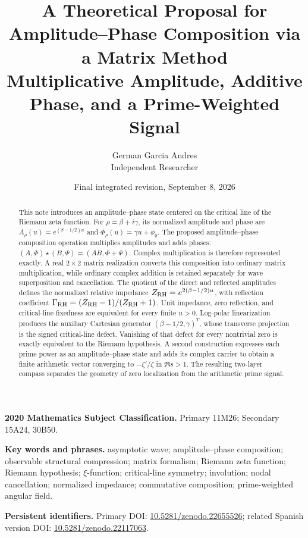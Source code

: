 \documentclass[11pt]{article}
\title{\textbf{A Theoretical Proposal for Amplitude--Phase Composition via a Matrix Method}\\[2mm]
\large Multiplicative Amplitude, Additive Phase, and a Prime-Weighted Signal}
\author{German Garcia Andres\\[1mm]\small Independent Researcher}
\date{Final integrated revision, September 8, 2026}
\begin{document}
\maketitle

\begin{abstract}
This note introduces an amplitude--phase state centered on the critical line of the Riemann
zeta function.  For $\rho=\beta+i\gamma$, its normalized amplitude and phase are
$A_\rho(u)=e^{(\beta-1/2)u}$ and $\Phi_\rho(u)=\gamma u+\phi_0$.  The proposed amplitude--phase composition operation
multiplies amplitudes and adds phases:
$(A,\Phi)\star(B,\Psi)=(AB,\Phi+\Psi)$.  Complex multiplication is therefore represented
exactly.  A real $2\times2$ matrix realization converts this composition into ordinary matrix
multiplication, while ordinary complex addition is retained separately for wave superposition and
cancellation.  The quotient of the direct and reflected amplitudes defines the normalized
relative impedance $Z_{\rm RH}=e^{2(\beta-1/2)u}$, with reflection coefficient
$\Gamma_{\rm RH}=(Z_{\rm RH}-1)/(Z_{\rm RH}+1)$.  Unit impedance, zero reflection, and
critical-line fixedness are equivalent for every finite $u>0$.  Log-polar linearization produces the auxiliary Cartesian generator
$(\beta-1/2,\gamma)^T$, whose transverse projection is the signed critical-line defect.
Vanishing of that defect for every nontrivial zero is exactly equivalent to the Riemann
hypothesis.  A second construction expresses each prime power as an amplitude--phase state and
adds its complex carrier to obtain a finite arithmetic vector converging to
$-\zeta'/\zeta$ in $\Re s>1$.  The resulting two-layer compass separates the geometry of zero
localization from the arithmetic prime signal.
\end{abstract}

\begin{center}
\begin{minipage}{0.94\linewidth}
\footnotesize
\textbf{2020 Mathematics Subject Classification.}
Primary 11M26; Secondary 15A24, 30B50.\par
\smallskip
\textbf{Key words and phrases.}
asymptotic wave; amplitude--phase composition; observable structural compression;
matrix formalism; Riemann zeta function; Riemann hypothesis; $\xi$-function;
critical-line symmetry; involution; nodal cancellation; normalized impedance;
commutative composition; prime-weighted angular field.\par
\smallskip
\textbf{Persistent identifiers.}
Primary DOI:
\href{https://doi.org/10.5281/zenodo.22655526}{10.5281/zenodo.22655526};
related Spanish version DOI:
\href{https://doi.org/10.5281/zenodo.22117063}{10.5281/zenodo.22117063}.
\end{minipage}
\end{center}
\end{document}
